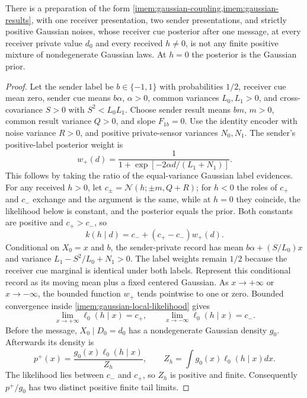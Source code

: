 There is a preparation of the form \cref{imem:gaussian-coupling,imem:gaussian-results}, with one receiver presentation, two sender presentations, and strictly positive Gaussian noises, whose receiver cue posterior after one message, at every receiver private value $d_0$ and every received $h\neq0$, is not any finite positive mixture of nondegenerate Gaussian laws. At $h=0$ the posterior is the Gaussian prior.
\begin{proof}
Let the sender label be $b\in\{-1,1\}$ with probabilities $1/2$, receiver cue mean zero, sender cue means $b\alpha$, $\alpha>0$, common variances $L_0,L_1>0$, and cross-covariance $S>0$ with $S^2<L_0L_1$. Choose sender result means $bm$, $m>0$, common result variance $Q>0$, and slope $F_{1b}=0$. Use the identity encoder with noise variance $R>0$, and positive private-sensor variances $N_0,N_1$. The sender's positive-label posterior weight is
\begin{equation}
 w_+(d)=\frac1{1+\exp[-2\alpha d/(L_1+N_1)]}.
 \label{imem:nonclosure-logistic}
\end{equation}
This follows by taking the ratio of the equal-variance Gaussian label evidences. For any received $h>0$, let $c_\pm=\mathcal N(h;\pm m,Q+R)$; for $h<0$ the roles of $c_+$ and $c_-$ exchange and the argument is the same, while at $h=0$ they coincide, the likelihood below is constant, and the posterior equals the prior. Both constants are positive and $c_+>c_-$, so
\begin{equation}
 k(h\mid d)=c_-+(c_+-c_-)w_+(d).
 \label{imem:nonclosure-message}
\end{equation}
Conditional on $X_0=x$ and $b$, the sender-private record has mean $b\alpha+(S/L_0)x$ and variance $L_1-S^2/L_0+N_1>0$. The label weights remain $1/2$ because the receiver cue marginal is identical under both labels. Represent this conditional record as its moving mean plus a fixed centered Gaussian. As $x\to+\infty$ or $x\to-\infty$, the bounded function $w_+$ tends pointwise to one or zero. Bounded convergence inside \cref{imem:gaussian-local-likelihood} gives
\begin{equation}
 \lim_{x\to+\infty}\ell_0(h\mid x)=c_+,
 \qquad
 \lim_{x\to-\infty}\ell_0(h\mid x)=c_-.
 \label{imem:nonclosure-tails}
\end{equation}
Before the message, $X_0\mid D_0=d_0$ has a nondegenerate Gaussian density $g_0$. Afterwards its density is
\begin{equation}
 p^+(x)=\frac{g_0(x)\ell_0(h\mid x)}{Z_h},\qquad
 Z_h=\int g_0(x)\ell_0(h\mid x)dx.
 \label{imem:nonclosure-posterior}
\end{equation}
The likelihood lies between $c_-$ and $c_+$, so $Z_h$ is positive and finite. Consequently $p^+/g_0$ has two distinct positive finite tail limits.


\end{proof}
